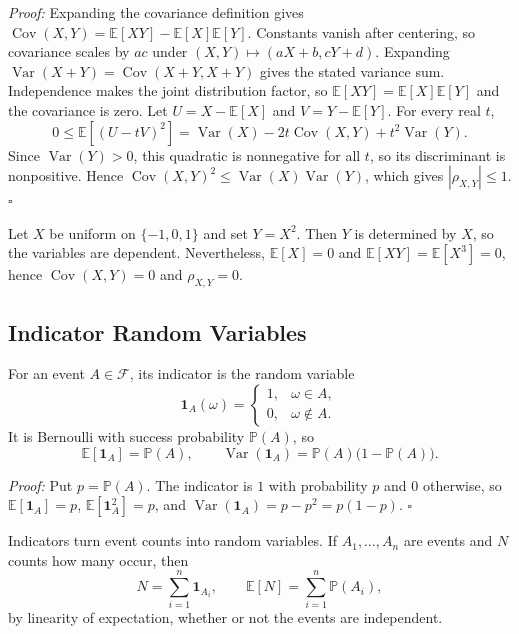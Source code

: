 \documentclass[a4paper,11pt,abstracton]{scrartcl}
\theoremstyle{dotlessP}
\theoremstyle{dotlessS}
\theoremstyle{remark}
\theoremstyle{definition}
\begin{document}
\begin{claim_box}
\textit{Proof:} Expanding the covariance definition gives $\operatorname{Cov}(X,Y)=\mathbb{E}[XY]-\mathbb{E}[X]\mathbb{E}[Y]$. Constants vanish after centering, so covariance scales by $ac$ under $(X,Y)\mapsto(aX+b,cY+d)$. Expanding $\operatorname{Var}(X+Y)=\operatorname{Cov}(X+Y,X+Y)$ gives the stated variance sum. Independence makes the joint distribution factor, so $\mathbb{E}[XY]=\mathbb{E}[X]\mathbb{E}[Y]$ and the covariance is zero.
Let $U=X-\mathbb{E}[X]$ and $V=Y-\mathbb{E}[Y]$. For every real $t$,
\[
  0\leq\mathbb{E}[(U-tV)^2]
  =\operatorname{Var}(X)-2t\operatorname{Cov}(X,Y)+t^2\operatorname{Var}(Y).
\]
Since $\operatorname{Var}(Y)>0$, this quadratic is nonnegative for all $t$, so its discriminant is nonpositive. Hence $\operatorname{Cov}(X,Y)^2\leq\operatorname{Var}(X)\operatorname{Var}(Y)$, which gives $|\rho_{X,Y}|\leq1$.
\hfill$\square$
\end{claim_box}
\begin{example_box}
Let $X$ be uniform on $\{-1,0,1\}$ and set $Y=X^2$. Then $Y$ is determined by $X$, so the variables are dependent. Nevertheless, $\mathbb{E}[X]=0$ and $\mathbb{E}[XY]=\mathbb{E}[X^3]=0$, hence $\operatorname{Cov}(X,Y)=0$ and $\rho_{X,Y}=0$.
\end{example_box}

\subsection{Indicator Random Variables}

For an event $A\in\mathcal{F}$, its indicator is the random variable
\[
  \mathbf{1}_A(\omega)=
  \begin{cases}
    1,&\omega\in A,\\
    0,&\omega\notin A.
  \end{cases}
\]
It is Bernoulli with success probability $\mathbb{P}(A)$, so
\[
  \mathbb{E}[\mathbf{1}_A]=\mathbb{P}(A),
  \qquad
  \operatorname{Var}(\mathbf{1}_A)
  =\mathbb{P}(A)\bigl(1-\mathbb{P}(A)\bigr).
\]
\begin{claim_box}
\textit{Proof:} Put $p=\mathbb{P}(A)$. The indicator is $1$ with probability $p$ and $0$ otherwise, so $\mathbb{E}[\mathbf{1}_A]=p$, $\mathbb{E}[\mathbf{1}_A^2]=p$, and $\operatorname{Var}(\mathbf{1}_A)=p-p^2=p(1-p)$.
\hfill$\square$
\end{claim_box}
Indicators turn event counts into random variables. If $A_1,\ldots,A_n$ are events and $N$ counts how many occur, then
\[
  N=\sum_{i=1}^n\mathbf{1}_{A_i},
  \qquad
  \mathbb{E}[N]=\sum_{i=1}^n\mathbb{P}(A_i),
\]
by linearity of expectation, whether or not the events are independent.
\end{document}
